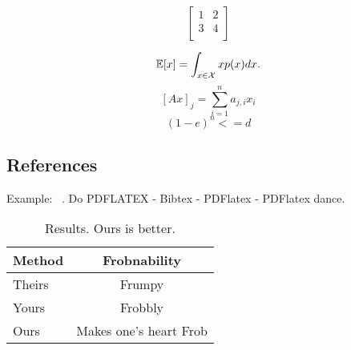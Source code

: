 \documentclass[10pt,twocolumn,letterpaper]{article}
\begin{document}
$$
\left[\begin{array}{cc}

1 & 2 \\ 
3 & 4 \\

\end{array}\right]
$$

\[
  \mathbb{E}[x] = \int_{x \in {\cal X}} x p(x) dx.
\]
$$
	[Ax]_j = \sum_{i=1}^{n}a_{j,i}x_i
$$
$$
(1-e)^n <=d
$$

\subsection{References}

Example: ~\cite{Authors11}. 
Do PDFLATEX - Bibtex - PDFlatex - PDFlatex dance.

\begin{table}
\caption{Results.   Ours is better.}
\begin{center}
\begin{tabular}{|l|c|}
\hline
Method & Frobnability \\
\hline\hline
Theirs & Frumpy \\
Yours & Frobbly \\
Ours & Makes one's heart Frob\\
\hline
\end{tabular}
\end{center}
\end{table}

{\small


}
\end{document}
